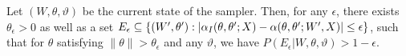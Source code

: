 \begin{proposition}
  Let $(W, \theta, \vartheta)$ be the current state of the sampler.
Then, for any $\epsilon$, there exists $\theta_\epsilon > 0$ as well as a set $E_\epsilon \subseteq \{(W', \theta'): |\alpha_I(\theta,\theta';X) - \alpha(\theta,\theta';W',X)| \le \epsilon\}$, such that for $\theta$ satisfying $\| \theta \| > \theta_\epsilon$ and any $\vartheta$, we have
$P(E_\epsilon|W,\theta,\vartheta) > 1-\epsilon$.
\end{proposition}
